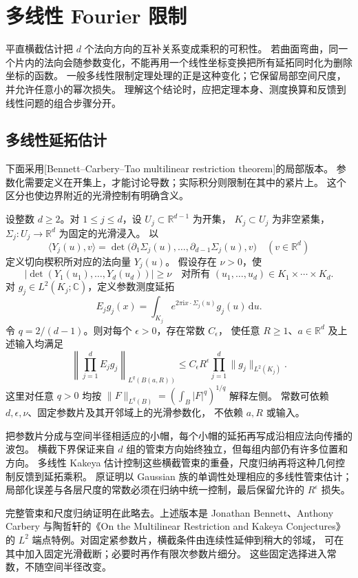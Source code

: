 \section{多线性 Fourier 限制}
\label{b2:sec:2504}

平直横截估计把 \(d\) 个法向方向的互补关系变成乘积的可积性。
若曲面弯曲，同一个片内的法向会随参数变化，不能再用一个线性坐标变换把所有延拓同时化为删除坐标的函数。
一般多线性限制定理处理的正是这种变化；它保留局部空间尺度，并允许任意小的幂次损失。
理解这个结论时，应把定理本身、测度换算和反馈到线性问题的组合步骤分开。

\subsection{多线性延拓估计}
\label{b2:subsec:250401}

下面采用[Bennett--Carbery--Tao multilinear restriction theorem]的局部版本。
参数化需要定义在开集上，才能讨论导数；实际积分则限制在其中的紧片上。
这个区分也使边界附近的光滑控制有明确含义。

\begin{theorem}\label{b2:thm:25-bct}
设整数 \(d\geq2\)。对 \(1\leq j\leq d\)，设
\(U_j\subset\mathbb R^{d-1}\) 为开集，
\(K_j\subset U_j\) 为非空紧集，
\(\Sigma_j:U_j\to\mathbb R^d\) 为固定的光滑浸入。
以
\[
 \langle Y_j(u),v\rangle
 =\det\bigl(\partial_1\Sigma_j(u),\ldots,
 \partial_{d-1}\Sigma_j(u),v\bigr)
 \quad(v\in\mathbb R^d)
\]
定义切向楔积所对应的法向量 \(Y_j(u)\)。
假设存在 \(\nu>0\)，使
\[
 |\det(Y_1(u_1),\ldots,Y_d(u_d))|\geq\nu
 \quad\text{对所有 }(u_1,\ldots,u_d)\in K_1\times\cdots\times K_d.
\]
对 \(g_j\in L^2(K_j;\mathbb C)\)，定义参数测度延拓
\[
 E_jg_j(x)=\int_{K_j}
 e^{2\pi\mathrm ix\cdot\Sigma_j(u)}g_j(u)\,\mathrm du.
\]
令 \(q=2/(d-1)\)。则对每个 \(\epsilon>0\)，存在常数 \(C_\epsilon\)，
使任意 \(R\geq1\)、\(a\in\mathbb R^d\) 及上述输入均满足
\[
 \left\|\prod_{j=1}^dE_jg_j\right\|_{L^q(B(a,R))}
 \leq C_\epsilon R^\epsilon\prod_{j=1}^d\|g_j\|_{L^2(K_j)}.
\]
这里对任意 \(q>0\) 均按
\(\|F\|_{L^q(B)}=(\int_B|F|^q)^{1/q}\) 解释左侧。
常数可依赖 \(d,\epsilon,\nu\)、固定参数片及其开邻域上的光滑参数化，
不依赖 \(a,R\) 或输入。
\end{theorem}
\begin{proofsketch}
把参数片分成与空间半径相适应的小帽，每个小帽的延拓再写成沿相应法向传播的波包。
横截下界保证来自 \(d\) 组的管束方向始终独立，但每组内部仍有许多位置和方向。
多线性 Kakeya 估计控制这些横截管束的重叠，尺度归纳再将这种几何控制反馈到延拓乘积。
原证明以 Gaussian 族的单调性处理相应的多线性管束估计；
局部化误差与各层尺度的常数必须在归纳中统一控制，最后保留允许的 \(R^\epsilon\) 损失。

完整管束和尺度归纳证明在此略去。上述版本是 Jonathan Bennett、Anthony Carbery 与陶哲轩的《On the Multilinear Restriction and Kakeya Conjectures》%
\cite[Theorem 1.16, p.~267; Sections 2--4]{Bennett2006Multilinear}
的 \(L^2\) 端点特例。对固定紧参数片，横截条件由连续性延伸到稍大的邻域，
可在其中加入固定光滑截断；必要时再作有限次参数片细分。
这些固定选择进入常数，不随空间半径改变。
\end{proofsketch}

